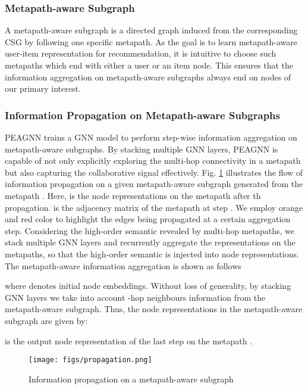 \documentclass[runningheads, envcountsame, a4paper]{llncs}
\begin{document}
\subsubsection{Metapath-aware Subgraph}
A metapath-aware subgraph is a directed graph induced from 
the corresponding CSG by following one 
specific metapath. 
As the goal is to learn metapath-aware 
user-item representation for recommendation,
it is intuitive to choose such metapaths 
which end with
either a user or an item node.
This ensures that the information aggregation on metapath-aware 
subgraphs always end on nodes of our primary interest. 


\subsubsection{Information Propagation on Metapath-aware Subgraphs}
PEAGNN trains a GNN model to perform step-wise information aggregation on metapath-aware subgraphs. By stacking multiple GNN layers, PEAGNN is capable of not only explicitly exploring the multi-hop connectivity in a metapath but also capturing the collaborative signal effectively. 
Fig. \ref{fig:propagation} illustrates the flow of information propagation on a given metapath-aware subgraph generated from the metapath . 
Here,  is the node representations on the metapath  after th propagation. 
 is the adjacency matrix of the metapath  at step . 
We employ orange and red color to highlight the edges being propagated at a certain aggregation step. 
Considering the high-order semantic revealed by multi-hop metapaths, we stack multiple GNN layers and recurrently aggregate the representations on the metapaths, so that the high-order semantic is injected into node representations. The metapath-aware information aggregation is shown as follows
 \vspace{-2mm}

where  denotes initial node embeddings. Without loss of generality, by stacking  GNN layers we take into account -hop neighbours information from the metapath-aware subgraph.
Thus, the node representations in the metapath-aware subgraph are given by:
 \vspace{-2mm}

 is the output node representation of the last step on the metapath .
\begin{figure}
 \vspace{-2mm}
    \centering
    \texttt{[image: figs/propagation.png]}
      \vspace{-3mm}
        \setlength{\belowcaptionskip}{-8pt}  
    \caption{Information  propagation  on a metapath-aware subgraph} 
\label{fig:propagation}
    \vspace{-1mm}
\end{figure}
\end{document}
